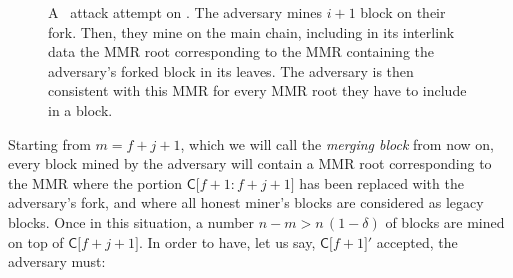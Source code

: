       \begin{figure}[ht]
        \centering
          \caption{A \cs\ attack attempt on \FC. The adversary mines \(i+1\) block on their fork. Then, they mine  on the main chain, including in its interlink data the MMR root corresponding to the MMR containing the adversary's forked block in its leaves. The adversary is then consistent with this MMR for every MMR root they have to include in a block.}
          \label{figure:chainsewingattempt}
        \end{figure}
      
        Starting from \(m=f+j+1\), which we will call the \textit{merging block} from now on, every block mined by the adversary will contain a MMR root corresponding to the MMR where the portion \(\mathsf{C[}f+1:f+j+1\mathsf{]}\) has been replaced with the adversary's fork, and where all honest miner's blocks are considered as legacy blocks. Once in this situation, a number \(n-m>n\,(1-\delta)\) of blocks are mined on top of \(\mathsf{C[}f+j+1\mathsf{]}\). In order to have, let us say, \(\mathsf{C[}f+1\mathsf{]}'\) accepted, the adversary must:
      
